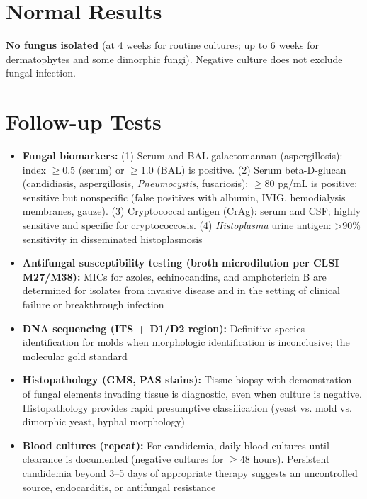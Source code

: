 \section*{Normal Results}
\textbf{No fungus isolated} (at 4 weeks for routine cultures; up to 6 weeks for dermatophytes and some dimorphic fungi). Negative culture does not exclude fungal infection.

\section*{Follow-up Tests}
\begin{itemize}
  \item \textbf{Fungal biomarkers:} (1) Serum and BAL galactomannan (aspergillosis): index $\geq$0.5 (serum) or $\geq$1.0 (BAL) is positive. (2) Serum beta-D-glucan (candidiasis, aspergillosis, \textit{Pneumocystis}, fusariosis): $\geq$80 pg/mL is positive; sensitive but nonspecific (false positives with albumin, IVIG, hemodialysis membranes, gauze). (3) Cryptococcal antigen (CrAg): serum and CSF; highly sensitive and specific for cryptococcosis. (4) \textit{Histoplasma} urine antigen: >90\% sensitivity in disseminated histoplasmosis
  \item \textbf{Antifungal susceptibility testing (broth microdilution per CLSI M27/M38):} MICs for azoles, echinocandins, and amphotericin B are determined for isolates from invasive disease and in the setting of clinical failure or breakthrough infection
  \item \textbf{DNA sequencing (ITS + D1/D2 region):} Definitive species identification for molds when morphologic identification is inconclusive; the molecular gold standard
  \item \textbf{Histopathology (GMS, PAS stains):} Tissue biopsy with demonstration of fungal elements invading tissue is diagnostic, even when culture is negative. Histopathology provides rapid presumptive classification (yeast vs. mold vs. dimorphic yeast, hyphal morphology)
  \item \textbf{Blood cultures (repeat):} For candidemia, daily blood cultures until clearance is documented (negative cultures for $\geq$48 hours). Persistent candidemia beyond 3--5 days of appropriate therapy suggests an uncontrolled source, endocarditis, or antifungal resistance
\end{itemize}

